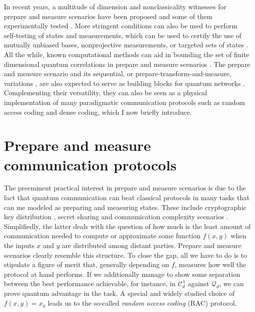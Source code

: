             \ornamentbreak
            
            In recent years, a multitude of dimension and nonclassicality witnesses for prepare and measure scenarios have been proposed \cite{gallego_pam_2010,brunner_dimension_2013,sikora_dimension_2016,dallarno_robustness_2012,de_vicente_bound_2019,bowles_certifying_2014,wehner_lower_2008} and some of them experimentally tested \cite{hendrych_experimental_2012,ahrens_experimental_2012,dambrosio_highdimensional_2014}. More stringent conditions can also be used to perform self-testing of states and measurements, which can be used to certify the use of mutually unbiased bases, nonprojective measurements, or targeted sets of states \cite{tavakoli_selftesting_2018,farkas_selftesting_2019,wei_selftesting_2019,mironowicz_fouroutcome_2019,tavakoli_selftesting_2020,miklin_universal_2021,moreno_pamdense_2021}. All the while, known computational methods can aid in bounding the set of finite dimensional quantum correlations in prepare and measure scenarios \cite{navascues_bounding_2015,navascues_characterizing_2015}. The prepare and measure scenario and its sequential, or prepare-transform-and-measure, variations \cite{mohan_sequential_2019,miklin_sequentialunsharp_2020}, are also expected to serve as building blocks for quantum networks \cite{bowles_pamnetworks_2015,wang_pamnetworks_2019}. Complementing their versatility, they can also be seen as a physical implementation of many paradigmatic communication protocols such as random access coding and dense coding, which I now briefly introduce.


    \section{Prepare and measure communication protocols}
    \label{sec:communication-protocols}

        The preeminent practical interest in prepare and measure scenarios is due to the fact that quantum communication can beat classical protocols in many tasks that can me modeled as preparing and measuring states. These include cryptographic key distribution \cite{pawlowski_pamqkd_2011}, secret sharing \cite{schmid_secret_2005} and communication complexity scenarios \cite{buhrman_communicationreview_2010}. Simplifiedly, the latter deals with the question of how much is the least amount of communication needed to compute or approximate some function $f(x,y)$ when the inputs $x$ and $y$ are distributed among distant parties. Prepare and measure scenarios clearly resemble this structure. To close the gap, all we have to do is to stipulate a figure of merit that, generally depending on $f$, measures how well the protocol at hand performs. If we additionally manage to show some separation between the best performance achievable, for instance, in $\mathcal{C}_d^\lambda$ against $\mathcal{Q}_d$, we can prove quantum advantage in the task. A special and widely studied choice of $f(x,y) = x_y$ leads us to the so-called \emph{random access coding} (RAC) protocol.

